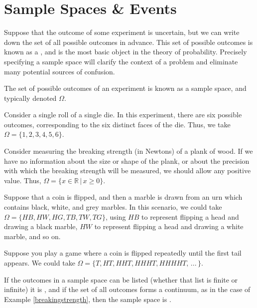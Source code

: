 \section{Sample Spaces \& Events} \label{sec 1.1}

Suppose that the outcome of some experiment is uncertain, but we can write down the set of all possible outcomes in advance. This set of possible outcomes is known as a , and is the most basic object in the theory of probability. Precisely specifying a sample space will clarify the context of a problem and eliminate many potential sources of confusion.

\begin{definition} The set of possible outcomes of an experiment is known as a sample space, and typically denoted $\Omega$.
\end{definition}
\begin{examp}Consider a single roll of a single die. In this experiment, there are six possible outcomes, corresponding to the six distinct faces of the die. Thus, we take $\Omega = \{1,2,3,4,5,6\}$.
\end{examp}
\begin{examp}\label{breakingstrength}Consider measuring the breaking strength (in Newtons) of a plank of wood. If we have no information about the size or shape of the plank, or about the precision with which the breaking strength will be measured, we should allow any positive value. Thus, $\Omega = \{x \in \mathbb{R} \, | \, x \geq 0\}$.\end{examp}
\begin{examp}Suppose that a coin is flipped, and then a marble is drawn from an urn which contains black, white, and grey marbles. In this scenario, we could take $\Omega = \{HB,HW,HG,TB,TW,TG\}$, using $HB$ to represent flipping a head and drawing a black marble, $HW$ to represent flipping a head and drawing a white marble, and so on. \end{examp}
\begin{examp}\label{FlipUntilTail}Suppose you play a game where a coin is flipped repeatedly until the first tail appears. We could take $\Omega = \{T, HT, HHT, HHHT, HHHHT, \, ...\, \}$. \end{examp}
\par
If the outcomes in a sample space can be listed (whether that list is finite or infinite) it is , and if the set of all outcomes forms a continuum, as in the case of Example \ref{breakingstrength}, then the sample space is .
